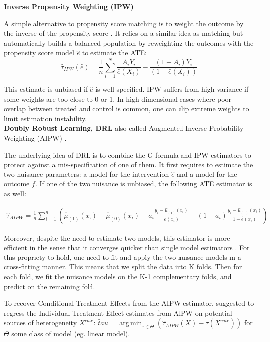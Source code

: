 \documentclass[10pt,letterpaper]{article}
\DeclareMathOperator*{\argmin}{arg\,min}
\begin{document}
\textbf{Inverse Propensity Weighting (IPW)}

A simple alternative to propensity score matching is to weight the outcome by
the inverse of the propensity score \cite{austin2015moving}. It relies on a
similar idea as matching but automatically builds a balanced population by
reweighting the outcomes with the propensity score model $\hat{e}$ to estimate
the ATE:
\begin{equation}
  \hat \tau_{IPW}(\hat e) = \frac{1}{n} \sum_{i=1}^N \frac{A_i Y_i}{\hat e(X_i)} - \frac{(1-A_i)Y_i}{(1-\hat e(X_i))}
\end{equation}

This estimate is unbiased if $\hat e$ is well-specified. IPW suffers from high
variance if some weights are too close to 0 or 1. In high dimensional cases
where poor overlap between treated and control is common, one can clip extreme
weights to limit estimation instability.\\


\textbf{Doubly Robust Learning, DRL} also called Augmented Inverse
Probability Weighting (AIPW) \cite{robins1994estimation}.

The underlying idea of DRL is to combine the G-formula and IPW estimators to
protect against a mis-specification of one of them. It first requires to
estimate the two nuisance parameters: a model for the intervention $\hat{e}$
and a model for the outcome $f$. If one of the two nuisance is unbiased, the
following ATE estimator is as well:

$$\begin{aligned} \widehat{\tau}_{A I P W}=\frac{1}{n}
    \sum_{i=1}^{n}\left(\hat \mu_{(1)}\left(x_{i}\right)-\hat \mu_{(0)}\left(x_{i}\right)+a_{i}
    \frac{y_{i}-\hat \mu_{(1)}\left(x_{i}\right)}{\hat{e}\left(x_{i}\right)}-\left(1-a_{i}\right)
    \frac{y_{i}-\hat \mu_{(0)}\left(x_{i}\right)}{1-\hat{e}\left(x_{i}\right)}\right)
  \end{aligned}$$

Moreover, despite the need to estimate two models, this estimator is more
efficient in the sense that it converges quicker than single model estimators
\cite{wager2020stats}. For this propriety to hold, one need to fit and apply
the two nuisance models in a cross-fitting manner. This means that we split
the data into K folds. Then for each fold, we fit the nuisance models on the
K-1 complementary folds, and predict on the remaining fold.

To recover Conditional Treatment Effects from the AIPW estimator,
\cite{foster2019orthogonal} suggested to regress the Individual Treatment
Effect estimates from AIPW on potential sources of heterogeneity $X^{cate}$:
$\hat tau = \argmin_{\tau \in \Theta} (\hat \tau_{AIPW}(X) - \tau(X^{cate}))$
for $\Theta$ some class of model (eg. linear model).\\
\end{document}
